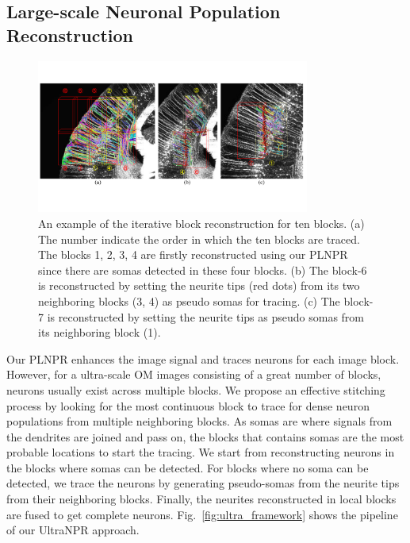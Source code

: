 \subsection{Large-scale Neuronal Population Reconstruction}
\label{sec:UltraNPR}

\begin{figure}[t]
	\centering
	\includegraphics[width=0.8\textwidth]{./Illustrations/ultranpr_block_search.pdf}
	\caption{An example of the iterative block reconstruction for ten blocks. (a) The number indicate the order in which the ten blocks are traced. The blocks 1, 2, 3, 4 are firstly reconstructed using our PLNPR since there are somas detected in these four blocks. (b) The block-6 is reconstructed by setting the neurite tips (red dots) from its two neighboring blocks (3, 4) as pseudo somas for tracing. (c) The block-7 is reconstructed by setting the neurite tips   as pseudo somas from its neighboring block (1).}
	\label{fig:blocksearch}
\end{figure}


Our PLNPR enhances the image signal and traces neurons for each image block.
However, for a ultra-scale OM images consisting of a great number of blocks, neurons usually exist across multiple blocks. 
We propose an effective stitching process by looking for the most continuous block to trace for dense neuron populations from multiple neighboring blocks. 
%
As somas are where signals from the dendrites are joined and pass on, the blocks that contains somas are the most probable locations to start the tracing.
We start from reconstructing neurons in the blocks where somas can be detected.
For blocks where no soma can be detected, we trace the neurons by generating pseudo-somas from the neurite tips from their neighboring blocks. 
%
Finally, the neurites reconstructed in local blocks are fused to get complete neurons. 
Fig.~\ref{fig:ultra_framework} shows the pipeline of our UltraNPR approach. 


